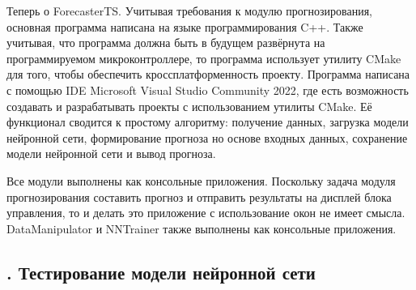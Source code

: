 {  \par \redline Теперь о ForecasterTS. Учитывая требования к модулю прогнозирования, основная программа написана на языке программирования C++. Также учитывая, что программа должна быть в будущем развёрнута на программируемом микроконтроллере, то программа использует утилиту CMake для того, чтобы обеспечить кроссплатформенность проекту. Программа написана с помощью IDE Microsoft Visual Studio Community 2022, где есть возможность создавать и разрабатывать проекты с использованием утилиты CMake. Её функционал сводится к простому алгоритму: получение данных, загрузка модели нейронной сети, формирование прогноза но основе входных данных, сохранение модели нейронной сети и вывод прогноза. 

  \par \redline Все модули выполнены как консольные приложения. Поскольку задача модуля прогнозирования составить прогноз и отправить результаты на дисплей блока управления, то и делать это приложение с использование окон не имеет смысла. DataManipulator и NNTrainer также выполнены как консольные приложения. 

}

\subtitlespace

\subsection*{ 
  \gostTitleFont
  \redline
  \thechaptercntr .\thesubchaptercntr \spc 
  Тестирование модели нейронной сети
} \addtocounter{subchaptercntr}{1} 
  
\subtitlespace
  
